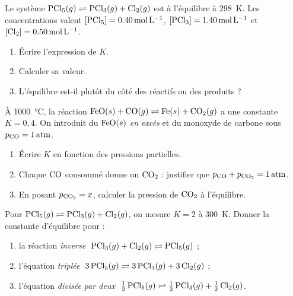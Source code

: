 \documentclass[11pt,a4paper]{article}
\begin{document}
\begin{center}
\end{center}

\begin{exercice}
Le système \;$\ce{PCl5}(g) \rightleftharpoons \ce{PCl3}(g) + \ce{Cl2}(g)$\; est à l'équilibre à
\SI{298}{\kelvin}. Les concentrations valent $[\ce{PCl5}]=\SI{0.40}{\mol\per\litre}$,
$[\ce{PCl3}]=\SI{1.40}{\mol\per\litre}$ et $[\ce{Cl2}]=\SI{0.50}{\mol\per\litre}$.
\begin{enumerate}[label=\alph*),leftmargin=2em,topsep=2pt,itemsep=2pt]
  \item Écrire l'expression de $K$.
  \item Calculer sa valeur.
  \item L'équilibre est-il plutôt du côté des réactifs ou des produits ?
\end{enumerate}
\end{exercice}

\begin{exercice}
À \SI{1000}{\celsius}, la réaction \;$\ce{FeO}(s) + \ce{CO}(g) \rightleftharpoons \ce{Fe}(s) + \ce{CO2}(g)$\;
a une constante $K = 0{,}4$. On introduit du $\ce{FeO}(s)$ \emph{en excès} et du monoxyde de carbone sous
$p_{\ce{CO}} = \SI{1}{atm}$.
\begin{enumerate}[label=\alph*),leftmargin=2em,topsep=2pt,itemsep=2pt]
  \item Écrire $K$ en fonction des pressions partielles.
  \item Chaque $\ce{CO}$ consommé donne un $\ce{CO2}$ : justifier que $p_{\ce{CO}} + p_{\ce{CO2}} = \SI{1}{atm}$.
  \item En posant $p_{\ce{CO2}} = x$, calculer la pression de $\ce{CO2}$ à l'équilibre.
\end{enumerate}
\end{exercice}

\begin{exercice}
Pour \;$\ce{PCl5}(g) \rightleftharpoons \ce{PCl3}(g) + \ce{Cl2}(g)$,\; on mesure $K = 2$ à \SI{300}{\kelvin}.
Donner la constante d'équilibre pour :
\begin{enumerate}[label=\alph*),leftmargin=2em,topsep=2pt,itemsep=2pt]
  \item la réaction \emph{inverse} $\;\ce{PCl3}(g) + \ce{Cl2}(g) \rightleftharpoons \ce{PCl5}(g)$ ;
  \item l'équation \emph{triplée} $\;3\,\ce{PCl5}(g) \rightleftharpoons 3\,\ce{PCl3}(g) + 3\,\ce{Cl2}(g)$ ;
  \item l'équation \emph{divisée par deux} $\;\tfrac12\,\ce{PCl5}(g) \rightleftharpoons \tfrac12\,\ce{PCl3}(g) + \tfrac12\,\ce{Cl2}(g)$.
\end{enumerate}
\end{exercice}
\end{document}
